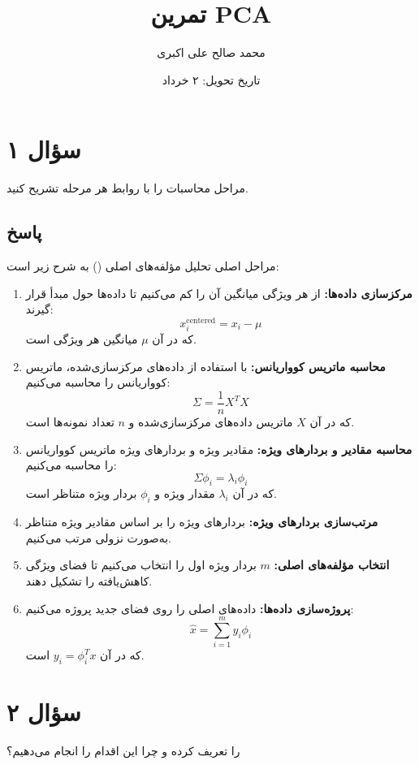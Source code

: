 \documentclass[12pt]{article}
\title{تمرین PCA}
\author{محمد صالح علی اکبری}
\date{تاریخ تحویل: ۲ خرداد}
\begin{document}
	
	\maketitle
	
	\section*{سؤال ۱}
	مراحل محاسبات  را با روابط هر مرحله تشریح کنید.
	
	\subsection*{پاسخ}
	مراحل اصلی تحلیل مؤلفه‌های اصلی () به شرح زیر است:
	
	\begin{enumerate}
		\item \textbf{مرکزسازی داده‌ها:} از هر ویژگی میانگین آن را کم می‌کنیم تا داده‌ها حول مبدأ قرار گیرند:
		\[
		x_i^{\text{centered}} = x_i - \mu
		\]
		که در آن $\mu$ میانگین هر ویژگی است.
		
		\item \textbf{محاسبه ماتریس کوواریانس:} با استفاده از داده‌های مرکزسازی‌شده، ماتریس کوواریانس را محاسبه می‌کنیم:
		\[
		\Sigma = \frac{1}{n} X^T X
		\]
		که در آن $X$ ماتریس داده‌های مرکزسازی‌شده و $n$ تعداد نمونه‌ها است.
		
		\item \textbf{محاسبه مقادیر و بردارهای ویژه:} مقادیر ویژه و بردارهای ویژه ماتریس کوواریانس را محاسبه می‌کنیم:
		\[
		\Sigma \phi_i = \lambda_i \phi_i
		\]
		که در آن $\lambda_i$ مقدار ویژه و $\phi_i$ بردار ویژه متناظر است.
		
		\item \textbf{مرتب‌سازی بردارهای ویژه:} بردارهای ویژه را بر اساس مقادیر ویژه متناظر به‌صورت نزولی مرتب می‌کنیم.
		
		\item \textbf{انتخاب مؤلفه‌های اصلی:} $m$ بردار ویژه اول را انتخاب می‌کنیم تا فضای ویژگی کاهش‌یافته را تشکیل دهند.
		
		\item \textbf{پروژه‌سازی داده‌ها:} داده‌های اصلی را روی فضای جدید پروژه می‌کنیم:
		\[
		\hat{x} = \sum_{i=1}^{m} y_i \phi_i
		\]
		که در آن $y_i = \phi_i^T x$ است.
	\end{enumerate}
	
	\section*{سؤال ۲}
	 را تعریف کرده و چرا این اقدام را انجام می‌دهیم؟
	
\end{document}
